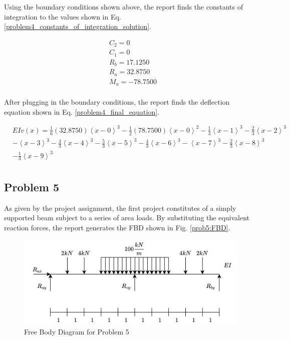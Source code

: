 \documentclass[a4paper]{article}
\begin{document}
Using the boundary conditions shown above, the report finds the constants of integration to the values shown in Eq. \ref{problem4_constants_of_integration_solution}.

\begin{equation}
\begin{split}
	& C_2 = 0 \\
	& C_1 = 0 \\
	& R_b = 17.1250\\
	& R_a = 32.8750\\
	& M_a = -78.7500\\
\end{split}
\label{problem4_constants_of_integration_solution}
\end{equation}

After plugging in the boundary conditions, the report finds the deflection equation shown in Eq. \ref{problem4_final_equation}.

\begin{equation}
\begin{split}
& EI v(x) = \frac{1}{6}\left(32.8750\right)\left<x-0\right>^3 - \frac{1}{2}\left(78.7500\right)\left<x-0\right>^2 - \frac{1}{3}\left<x-1\right>^3 - \frac{2}{3}\left<x-2\right>^3 \\
& - \left<x-3\right>^3 - \frac{4}{3}\left<x-4\right>^3 - \frac{5}{3}\left<x-5\right>^3  -  \frac{4}{3}\left<x-6\right>^3 - \left<x-7\right>^3 -  \frac{2}{3}\left<x-8\right>^3  \\
& - \frac{1}{3}\left<x-9\right>^3 \\
\end{split}
\label{problem4_final_equation}
\end{equation}



\subsection{Problem 5}

As given by the project assignment, the first project constitutes of a simply supported beam subject to a series of area loads. By substituting the equivalent reaction forces, the report generates the FBD shown in Fig. \ref{prob5:FBD}.

\begin{figure}[h]
\includegraphics[width=\textwidth]{FBD/FBD_5.jpg}
\caption{Free Body Diagram for Problem 5}
\label{FBD_5}
\end{figure}
\end{document}
